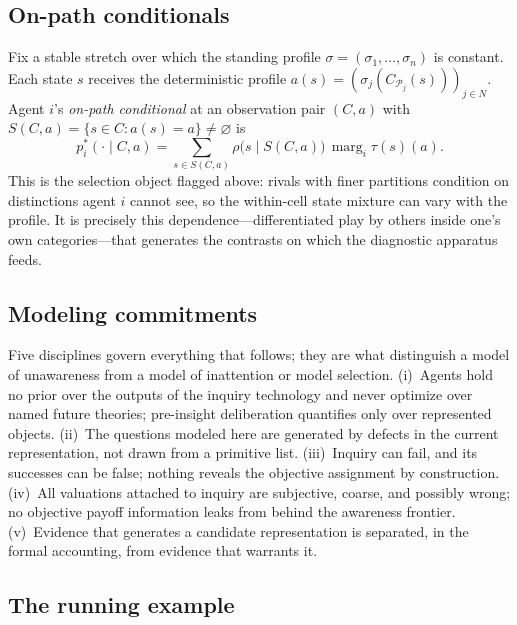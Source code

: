 \documentclass[11pt]{article}
\theoremstyle{definition}
\newcommand{\emptysetset}{\varnothing}
\newcommand{\marg}[1]{\operatorname{marg}_{#1}}
\begin{document}
\subsection{On-path conditionals}

Fix a stable stretch over which the standing profile $\sigma=(\sigma_1,\dots,\sigma_n)$ is constant.
Each state $s$ receives the deterministic profile $a(s)=(\sigma_j(C_{\mathcal P_j}(s)))_{j\in N}$.
Agent $i$'s \emph{on-path conditional} at an observation pair $(C,a)$ with $S(C,a)=\{s\in C:a(s)=a\}\neq\emptysetset$ is
\begin{equation}
p_i^{*}(\cdot\mid C,a)
=
\sum_{s\in S(C,a)}\rho\bigl(s\mid S(C,a)\bigr)\,\marg{i}\tau(s)(a).
\label{eq:onpath-conditional}
\end{equation}
This is the selection object flagged above: rivals with finer partitions condition on distinctions agent $i$ cannot see, so the within-cell state mixture can vary with the profile.
It is precisely this dependence---differentiated play by others inside one's own categories---that generates the contrasts on which the diagnostic apparatus feeds.

\subsection{Modeling commitments}
\label{sec:commitments}

Five disciplines govern everything that follows; they are what distinguish a model of unawareness from a model of inattention or model selection.
(i)~Agents hold no prior over the outputs of the inquiry technology and never optimize over named future theories; pre-insight deliberation quantifies only over represented objects.
(ii)~The questions modeled here are generated by defects in the current representation, not drawn from a primitive list.
(iii)~Inquiry can fail, and its successes can be false; nothing reveals the objective assignment by construction.
(iv)~All valuations attached to inquiry are subjective, coarse, and possibly wrong; no objective payoff information leaks from behind the awareness frontier.
(v)~Evidence that generates a candidate representation is separated, in the formal accounting, from evidence that warrants it.

\subsection{The running example}
\end{document}
